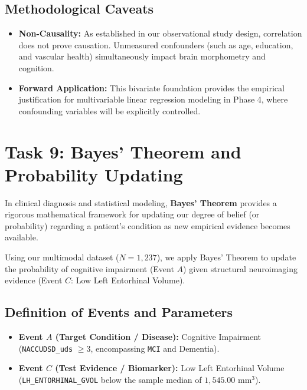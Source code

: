 \documentclass[11pt, a4paper]{article}
\begin{document}
\subsection{Methodological Caveats}
\begin{itemize}
    \item \textbf{Non-Causality:} As established in our observational study design, correlation does not prove causation. Unmeasured confounders (such as age, education, and vascular health) simultaneously impact brain morphometry and cognition.
    \item \textbf{Forward Application:} This bivariate foundation provides the empirical justification for multivariable linear regression modeling in Phase 4, where confounding variables will be explicitly controlled.
\end{itemize}

\section{Task 9: Bayes' Theorem and Probability Updating}
In clinical diagnosis and statistical modeling, \textbf{Bayes' Theorem} provides a rigorous mathematical framework for updating our degree of belief (or probability) regarding a patient's condition as new empirical evidence becomes available.

Using our multimodal dataset ($N = 1,237$), we apply Bayes' Theorem to update the probability of cognitive impairment (Event $A$) given structural neuroimaging evidence (Event $C$: Low Left Entorhinal Volume).

\subsection{Definition of Events and Parameters}
\begin{itemize}
    \item \textbf{Event $A$ (Target Condition / Disease):} Cognitive Impairment (\texttt{NACCUDSD\_uds} $\ge 3$, encompassing \texttt{MCI} and Dementia).
    \item \textbf{Event $C$ (Test Evidence / Biomarker):} Low Left Entorhinal Volume (\texttt{LH\_ENTORHINAL\_GVOL} below the sample median of $1,545.00\text{ mm}^3$).
\end{itemize}
\end{document}
